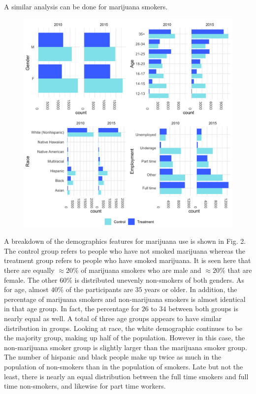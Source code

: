 \documentclass[a4paper, 10pt, conference]{ieeeconf}
\begin{document}
A similar analysis can be done for marijuana smokers. 
\begin{figure} \includegraphics[scale = 0.11]{MarijuanaDemographics}  \end{figure} 
\parindent 10pt A breakdown of the demographics features for marijuana use is shown in Fig. 2. The control group refers to people who have not smoked marijuana whereas the treatment group refers to people who have smoked marijuana. It is seen here that there are equally $\approx 20\%$ of marijuana smokers who are male and $\approx 20\%$ that are female. The other $60\%$ is distributed unevenly non-smokers of both genders. As for age, almost $40\%$ of the participants are $35$ years or older. In addition, the percentage of marijuana smokers and non-marijuana smokers is almost identical in that age group. In fact, the percentage for $26$ to $34$ between both groups is nearly equal as well. A total of three age groups appears to have similar distribution in groups. Looking at race, the white demographic continues to be the majority group, making up half of the population. However in this case, the non-marijuana smoker group is slightly larger than the marijuana smoker group. The number of hispanic and black people make up twice as much in the population of non-smokers than in the population of smokers. Late but not the least, there is nearly an equal distribution between the full time smokers and full time non-smokers, and likewise for part time workers. 
\end{document}
